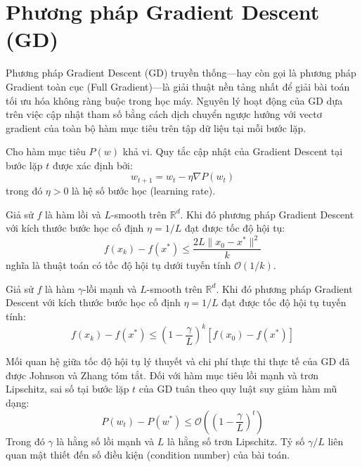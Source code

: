 \section{Phương pháp Gradient Descent (GD)}

Phương pháp Gradient Descent (GD) truyền thống—hay còn gọi là phương pháp Gradient toàn cục (Full Gradient)—là giải thuật nền tảng nhất để giải bài toán tối ưu hóa không ràng buộc trong học máy. Nguyên lý hoạt động của GD dựa trên việc cập nhật tham số bằng cách dịch chuyển ngược hướng với vectơ gradient của toàn bộ hàm mục tiêu trên tập dữ liệu tại mỗi bước lặp.

\begin{definition}
\label{def:gd_update}
Cho hàm mục tiêu $P(w)$ khả vi. Quy tắc cập nhật của Gradient Descent tại bước lặp $t$ được xác định bởi:
\begin{equation}\label{eq:gd_update_rule}
w_{t+1} = w_t - \eta \nabla P(w_t)
\end{equation}
trong đó $\eta > 0$ là hệ số bước học (learning rate).
\end{definition}

\begin{theorem}
\label{thm:gd_convex_smooth}
Giả sử $f$ là hàm lồi và $L$-smooth trên $\mathbb{R}^d$. Khi đó phương pháp Gradient Descent với kích thước bước học cố định $\eta = 1/L$ đạt được tốc độ hội tụ:
\begin{equation}
f(x_k) - f(x^*) \le \frac{2L \|x_0 - x^*\|^2}{k}
\end{equation}
nghĩa là thuật toán có tốc độ hội tụ dưới tuyến tính $\mathcal{O}(1/k)$.
\end{theorem}

\begin{theorem}
\label{thm:gd_strongly_convex}
Giả sử $f$ là hàm $\gamma$-lồi mạnh và $L$-smooth trên $\mathbb{R}^d$. Khi đó phương pháp Gradient Descent với kích thước bước học cố định $\eta = 1/L$ đạt được tốc độ hội tụ tuyến tính:
\begin{equation}
f(x_k) - f(x^*) \le \left(1 - \frac{\gamma}{L}\right)^k \left[ f(x_0) - f(x^*) \right]
\end{equation}
\end{theorem}

Mối quan hệ giữa tốc độ hội tụ lý thuyết và chi phí thực thi thực tế của GD đã được Johnson và Zhang \cite{johnson2013accelerating} tóm tắt. Đối với hàm mục tiêu lồi mạnh và trơn Lipschitz, sai số tại bước lặp $t$ của GD tuân theo quy luật suy giảm hàm mũ dạng:
\begin{equation}
P(w_t) - P(w^*) \le \mathcal{O}\left(\left(1 - \frac{\gamma}{L}\right)^t\right)
\end{equation}
Trong đó $\gamma$ là hằng số lồi mạnh và $L$ là hằng số trơn Lipschitz. Tỷ số $\gamma/L$ liên quan mật thiết đến số điều kiện (condition number) của bài toán.

